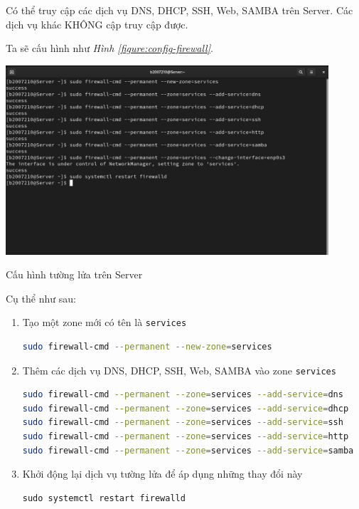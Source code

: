 \documentclass[a4paper, 11pt]{article}
\begin{document}
Có thể truy cập các dịch vụ DNS, DHCP, SSH, Web, SAMBA trên Server. Các dịch vụ khác KHÔNG cập truy cập được.

Ta sẽ cấu hình như \textit{Hình \ref{figure:config-firewall}}.

\begin{minipage}
    {\linewidth}
    \captionsetup{type=figure}
    \centering
    \includegraphics[width=12cm]{images/config-firewall.png}
    \caption{Cấu hình tường lửa trên Server}
    \label{figure:config-firewall}
\end{minipage}

Cụ thể như sau:
\begin{enumerate}
    \item Tạo một zone mới có tên là \texttt{services}
          \begin{lstlisting}[language=bash, caption=Tạo zone mới có tên là \texttt{services}]
sudo firewall-cmd --permanent --new-zone=services
\end{lstlisting}
    \item Thêm các dịch vụ DNS, DHCP, SSH, Web, SAMBA vào zone \texttt{services}
          \begin{lstlisting}[language=bash, caption={Thêm các dịch vụ DNS, DHCP, SSH, Web, SAMBA vào zone \texttt{services}}]
sudo firewall-cmd --permanent --zone=services --add-service=dns
sudo firewall-cmd --permanent --zone=services --add-service=dhcp
sudo firewall-cmd --permanent --zone=services --add-service=ssh
sudo firewall-cmd --permanent --zone=services --add-service=http
sudo firewall-cmd --permanent --zone=services --add-service=samba
\end{lstlisting}
    \item Khởi động lại dịch vụ tường lửa để áp dụng những thay đổi này
          \begin{lstlisting}
sudo systemctl restart firewalld
\end{lstlisting}
\end{enumerate}
\end{document}
